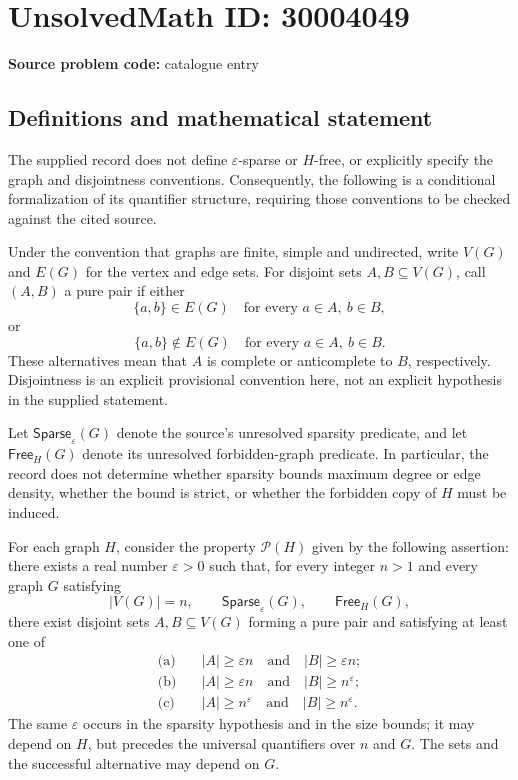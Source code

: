 \documentclass[11pt]{article}
\begin{document}
\section*{UnsolvedMath ID: 30004049}
\textbf{Source problem code:} catalogue entry
\subsection{Definitions and mathematical statement}
The supplied record does not define \(\varepsilon\)-sparse or \(H\)-free, or explicitly specify the graph and disjointness conventions. Consequently, the following is a conditional formalization of its quantifier structure, requiring those conventions to be checked against the cited source.

Under the convention that graphs are finite, simple and undirected, write \(V(G)\) and \(E(G)\) for the vertex and edge sets. For disjoint sets \(A,B\subseteq V(G)\), call \((A,B)\) a pure pair if either
\[
\{a,b\}\in E(G)\quad\text{for every }a\in A,\ b\in B,
\]
or
\[
\{a,b\}\notin E(G)\quad\text{for every }a\in A,\ b\in B.
\]
These alternatives mean that \(A\) is complete or anticomplete to \(B\), respectively. Disjointness is an explicit provisional convention here, not an explicit hypothesis in the supplied statement.

Let \(\mathsf{Sparse}_{\varepsilon}(G)\) denote the source's unresolved sparsity predicate, and let \(\mathsf{Free}_{H}(G)\) denote its unresolved forbidden-graph predicate. In particular, the record does not determine whether sparsity bounds maximum degree or edge density, whether the bound is strict, or whether the forbidden copy of \(H\) must be induced.

For each graph \(H\), consider the property \(\mathcal P(H)\) given by the following assertion: there exists a real number \(\varepsilon>0\) such that, for every integer \(n>1\) and every graph \(G\) satisfying
\[
|V(G)|=n,\qquad \mathsf{Sparse}_{\varepsilon}(G),\qquad \mathsf{Free}_{H}(G),
\]
there exist disjoint sets \(A,B\subseteq V(G)\) forming a pure pair and satisfying at least one of
\begin{align*}
\text{(a)}\quad &|A|\geq\varepsilon n\quad\text{and}\quad |B|\geq\varepsilon n;\\
\text{(b)}\quad &|A|\geq\varepsilon n\quad\text{and}\quad |B|\geq n^{\varepsilon};\\
\text{(c)}\quad &|A|\geq n^{\varepsilon}\quad\text{and}\quad |B|\geq n^{\varepsilon}.
\end{align*}
The same \(\varepsilon\) occurs in the sparsity hypothesis and in the size bounds; it may depend on \(H\), but precedes the universal quantifiers over \(n\) and \(G\). The sets and the successful alternative may depend on \(G\).
\end{document}
